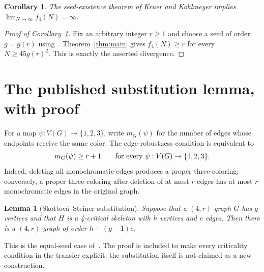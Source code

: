 \documentclass[11pt]{article}
\newtheorem{lemma}[theorem]{Lemma}
\newtheorem{corollary}[theorem]{Corollary}
\begin{document}
\begin{corollary}\label{cor:limit}
The seed-existence theorem of Kruer and Kohlmeyer implies
$\displaystyle\lim_{N\to\infty}f_4(N)=\infty$.
\end{corollary}

\begin{proof}[Proof of Corollary~\ref{cor:limit}]
Fix an arbitrary integer $r\geq1$ and choose a seed of order $g=g(r)$
using~\cite[Theorem 1.1]{KK}. Theorem~\ref{thm:main} gives $f_4(N)\geq r$
for every $N\geq45g(r)^2$. This is exactly the asserted divergence.
\end{proof}

\section{The published substitution lemma, with proof}

For a map $\psi:V(G)\to\{1,2,3\}$, write $m_G(\psi)$ for the number
of edges whose endpoints receive the same color. The edge-robustness
condition is equivalent to
\begin{equation}\label{eq:mono}
m_G(\psi)\geq r+1\qquad\hbox{for every }\psi:V(G)\to\{1,2,3\}.
\end{equation}
Indeed, deleting all monochromatic edges produces a proper three-coloring;
conversely, a proper three-coloring after deletion of at most $r$ edges
has at most $r$ monochromatic edges in the original graph.

\begin{lemma}[Skottov\'a--Steiner substitution]\label{lem:sub}
Suppose that a $(4,r)$-graph $G$ has $g$ vertices and that $H$ is a
4-critical skeleton with $h$ vertices and $e$ edges. Then there is a
$(4,r)$-graph of order $h+(g-1)e$.
\end{lemma}

This is the equal-seed case of~\cite[Lemma 2.1]{SS}. The proof is included
to make every criticality condition in the transfer explicit; the
substitution itself is not claimed as a new construction.
\end{document}
